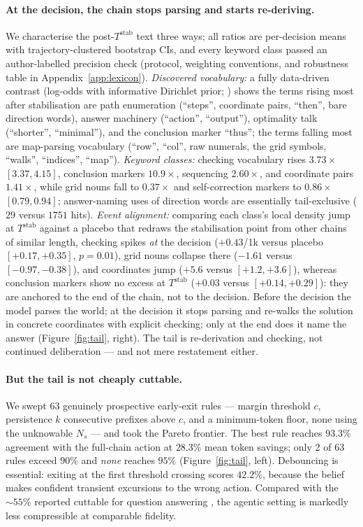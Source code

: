 \documentclass{article}
\newcommand{\Tstab}{T^{\mathrm{stab}}}
\begin{document}
\paragraph{At the decision, the chain stops parsing and starts re-deriving.} We
characterise the post-$\Tstab$ text three ways; all ratios are per-decision means with
trajectory-clustered bootstrap CIs, and every keyword class passed an author-labelled
precision check (protocol, weighting conventions, and robustness table in
Appendix~\ref{app:lexicon}). \emph{Discovered vocabulary:} a fully data-driven contrast
(log-odds with informative Dirichlet prior; \citealp{monroe2008}) shows the terms rising
most after stabilisation are path enumeration (``steps'', coordinate pairs, ``then'',
bare direction words), answer machinery (``action'', ``output''), optimality talk
(``shorter'', ``minimal''), and the conclusion marker ``thus''; the terms falling most
are map-parsing vocabulary (``row'', ``col'', raw numerals, the grid symbols,
``walls'', ``indices'', ``map''). \emph{Keyword classes:} checking vocabulary rises
$3.73\times$ $[3.37, 4.15]$, conclusion markers $10.9\times$, sequencing $2.60\times$,
and coordinate pairs $1.41\times$, while grid nouns fall to $0.37\times$ and
self-correction markers to $0.86\times$ $[0.79, 0.94]$; answer-naming uses of direction
words are essentially tail-exclusive ($29$ versus $1751$ hits). \emph{Event alignment:}
comparing each class's local density jump at $\Tstab$ against a placebo that redraws the
stabilisation point from other chains of similar length, checking spikes \emph{at} the
decision ($+0.43$/1k versus placebo $[+0.17, +0.35]$, $p = 0.01$), grid nouns collapse
there ($-1.61$ versus $[-0.97, -0.38]$), and coordinates jump ($+5.6$ versus
$[+1.2, +3.6]$), whereas conclusion markers show no excess at $\Tstab$ ($+0.03$ versus
$[+0.14, +0.29]$): they are anchored to the end of the chain, not to the decision.
Before the decision the model parses the world; at the decision it stops parsing and
re-walks the solution in concrete coordinates with explicit checking; only at the end
does it name the answer (Figure~\ref{fig:tail}, right). The tail is re-derivation and
checking, not continued deliberation --- and not mere restatement either.

\paragraph{But the tail is not cheaply cuttable.} We swept 63 genuinely prospective
early-exit rules --- margin threshold $c$, persistence $k$ consecutive prefixes above $c$,
and a minimum-token floor, none using the unknowable $N_s$ --- and took the Pareto
frontier. The best rule reaches $93.3\%$ agreement with the full-chain action at $28.3\%$
mean token savings; only 2 of 63 rules exceed $90\%$ and \emph{none} reaches $95\%$
(Figure~\ref{fig:tail}, left). Debouncing is essential: exiting at the first threshold
crossing scores $42.2\%$, because the belief makes confident transient excursions to the
wrong action. Compared with the ${\sim}55\%$ reported cuttable for question answering
\citep{boundary2026}, the agentic setting is markedly less compressible at comparable
fidelity.
\end{document}
